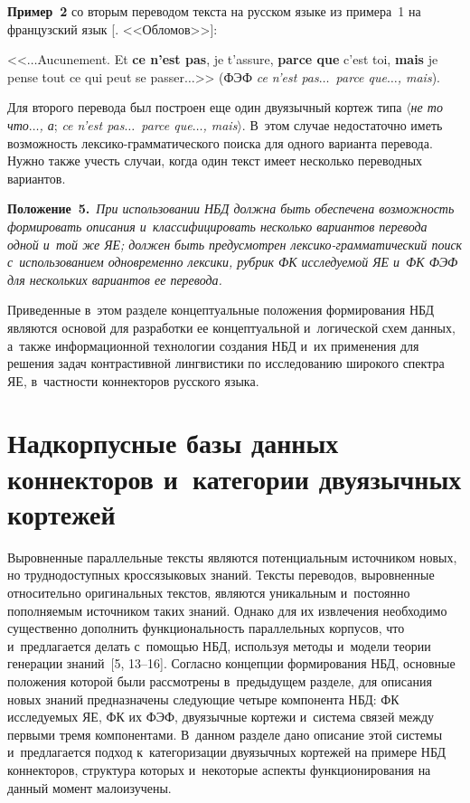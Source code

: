 \begin{multicols}{2}
\smallskip
  
\noindent
  \textbf{Пример~2} со вторым переводом текста на русском языке из примера~1 на 
французский язык [. <<Обломов>>]:
  
  <<$\ldots$Aucunement. Et \textbf{ce n'est pas}, je t'assure, \textbf{parce que} c'est toi, 
\textbf{mais} je pense {} tout ce qui peut se passer$\ldots$>> (ФЭФ \textit{ce n'est 
pas$\ldots$\ parce que$\ldots$, mais}).
  
  Для второго перевода был построен еще один двуязычный кортеж типа 
$\langle$\textit{не то что$\ldots$, а}; \textit{ce n'est pas$\ldots$\ parce que$\ldots$, 
mais}$\rangle$. В~этом случае недостаточно иметь возможность  
лек\-си\-ко-грам\-ма\-ти\-че\-ско\-го поиска для одного варианта перевода. 
Нужно также учесть случаи, когда один текст имеет несколько переводных 
вариантов.
  
  \smallskip
  
  \noindent
  \textbf{Положение~5.}\ \textit{При использовании НБД должна быть 
обеспечена возможность формировать описания и~классифицировать 
несколько вариантов перевода одной и~той же ЯЕ; должен 
быть предусмотрен лек\-си\-ко-грам\-ма\-ти\-че\-ский поиск 
с~использованием одновременно лексики, руб\-рик ФК исследуемой ЯЕ и~ФК 
ФЭФ для нескольких вариантов ее перевода.}
  
  \smallskip
  
  Приведенные в~этом разделе концептуальные положения формирования 
НБД являются основой для разработки ее концептуальной и~логической схем 
данных, а~также информационной технологии создания НБД и~их 
применения для решения задач контрастивной лингвистики по исследованию 
широкого спект\-ра ЯЕ, в~частности коннекторов русского 
языка.

\vspace*{-9pt}
  
\section{Надкорпусные базы данных коннекторов и~категории двуязычных кортежей}

  Выровненные параллельные тексты являются потенциальным источником 
новых, но труднодоступных кроссязыковых знаний. Тексты переводов, 
выровненные относительно оригинальных текстов, являются уникальным 
и~постоянно пополняемым источником таких знаний. Однако для их 
извлечения необходимо существенно дополнить функциональность 
параллельных корпусов, что и~предлагается делать с~помощью НБД, 
используя методы и~модели теории генерации  
знаний~[5, 13--16]. Согласно концепции 
формирования НБД, основные положения которой были рассмотрены 
в~предыдущем разделе, для описания новых знаний предназначены 
следующие четыре компонента НБД: ФК исследуемых ЯЕ, ФК их ФЭФ, 
двуязычные кортежи и~система связей между первыми тремя компонентами. 
В~данном разделе дано описание этой сис\-те\-мы и~предлагается подход 
к~категоризации двуязычных кортежей на примере НБД коннекторов, 
структура которых и~некоторые аспекты функционирования на данный 
момент малоизучены.
  

\end{multicols}
